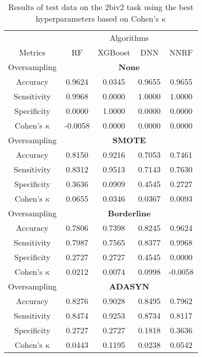 \begin{table}[!htb]
\centering
\caption{Results of test data on the 2biv2 task using the best hyperparameters based on Cohen's $\kappa$}
\label{tab:2biv2_test_results}
\begin{tabular}{c | c c c c}
\hline
 & \multicolumn{4}{c}{Algorithms}\\ 
Metrics &RF & XGBoost & DNN & NNRF\\ 
\hline
Oversampling &\multicolumn{4}{|c}{\textbf{None}}\\ 
\hline
Accuracy & 0.9624 & 0.0345 & 0.9655 & 0.9655\\ 
Sensitivity & 0.9968 & 0.0000 & 1.0000 & 1.0000\\ 
Specificity & 0.0000 & 1.0000 & 0.0000 & 0.0000\\ 
Cohen's $\kappa$ & -0.0058 & 0.0000 & 0.0000 & 0.0000\\ 
\hline
Oversampling &\multicolumn{4}{|c}{\textbf{SMOTE}}\\ 
\hline
Accuracy & 0.8150 & 0.9216 & 0.7053 & 0.7461\\ 
Sensitivity & 0.8312 & 0.9513 & 0.7143 & 0.7630\\ 
Specificity & 0.3636 & 0.0909 & 0.4545 & 0.2727\\ 
Cohen's $\kappa$ & 0.0655 & 0.0346 & 0.0367 & 0.0093\\ 
\hline
Oversampling &\multicolumn{4}{|c}{\textbf{Borderline}}\\ 
\hline
Accuracy & 0.7806 & 0.7398 & 0.8245 & 0.9624\\ 
Sensitivity & 0.7987 & 0.7565 & 0.8377 & 0.9968\\ 
Specificity & 0.2727 & 0.2727 & 0.4545 & 0.0000\\ 
Cohen's $\kappa$ & 0.0212 & 0.0074 & 0.0998 & -0.0058\\ 
\hline
Oversampling &\multicolumn{4}{|c}{\textbf{ADASYN}}\\ 
\hline
Accuracy & 0.8276 & 0.9028 & 0.8495 & 0.7962\\ 
Sensitivity & 0.8474 & 0.9253 & 0.8734 & 0.8117\\ 
Specificity & 0.2727 & 0.2727 & 0.1818 & 0.3636\\ 
Cohen's $\kappa$ & 0.0443 & 0.1195 & 0.0238 & 0.0542\\ 
\hline
\end{tabular}
\end{table}


